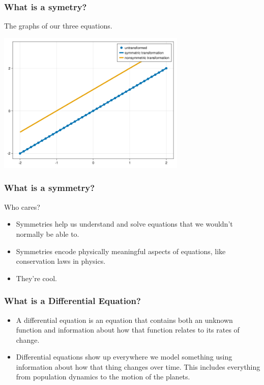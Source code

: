 \documentclass{beamer}
\begin{document}
\begin{frame}
    \frametitle{What is a symetry?}
    The graphs of our three equations.\\
    \begin{center}
        \includegraphics[width=9cm]{y=x+1.png}
    \end{center}
\end{frame}



\begin{frame}
    \frametitle{What is a symmetry?}
    \begin{Large}
        Who cares?
    \end{Large}
    \vspace*{0.25in}
    \begin{itemize}
        \item Symmetries help us understand and solve equations that we wouldn't normally be able to.\pause
        \item Symmetries encode physically meaningful aspects of equations, like conservation laws in physics.\pause
        \item They're cool.
    \end{itemize}
\end{frame}



\begin{frame}
    \frametitle{What is a Differential Equation?}
    \begin{definition}
    \begin{itemize}
        \item A differential equation is an equation that contains both an unknown function and information about how that function relates to its rates of change. \pause
        \item Differential equations show up everywhere we model something using information about how that thing changes over time. This includes everything from population dynamics to the motion of the planets.
    \end{itemize}
\end{definition}
\end{frame}
\end{document}
